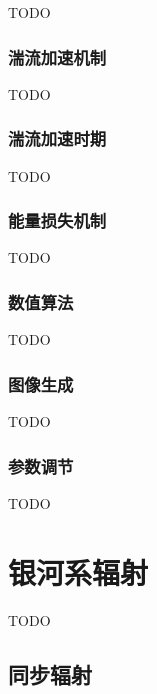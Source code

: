 TODO

\subsubsection{湍流加速机制}

TODO

\subsubsection{湍流加速时期}

TODO

\subsubsection{能量损失机制}

TODO

\subsubsection{数值算法}

TODO

\subsubsection{图像生成}

TODO

\subsubsection{参数调节}

TODO


\section{银河系辐射}

TODO

\subsection{同步辐射}

